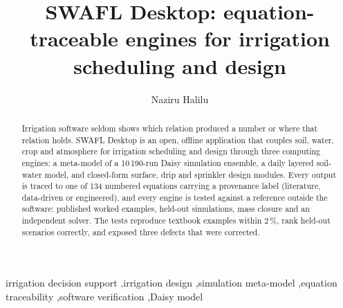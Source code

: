 \documentclass[preprint,12pt]{elsarticle}
\begin{document}
\begin{frontmatter}
\title{SWAFL Desktop: equation-traceable engines for irrigation scheduling and design}

\author[aua,upna]{Naziru Halilu}

\begin{abstract}
Irrigation software seldom shows which relation produced a number or where that relation holds. SWAFL Desktop is an open, offline application that couples soil, water, crop and atmosphere for irrigation scheduling and design through three computing engines: a meta-model of a 10\,190-run Daisy simulation ensemble, a daily layered soil-water model, and closed-form surface, drip and sprinkler design modules. Every output is traced to one of 134 numbered equations carrying a provenance label (literature, data-driven or engineered), and every engine is tested against a reference outside the software: published worked examples, held-out simulations, mass closure and an independent solver. The tests reproduce textbook examples within 2\,\%, rank held-out scenarios correctly, and exposed three defects that were corrected.
\end{abstract}

\begin{keyword}
irrigation decision support \sep irrigation design \sep simulation meta-model \sep equation traceability \sep software verification \sep Daisy model
\end{keyword}
\end{frontmatter}
\end{document}
